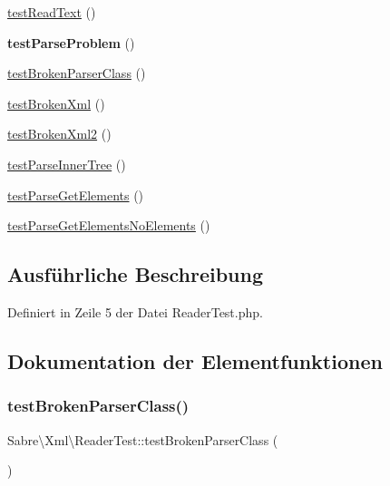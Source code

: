 \begin{DoxyCompactItemize}
\mbox{\hyperlink{class_sabre_1_1_xml_1_1_reader_test_a49fab39e675f5ffcd5bb756db6bb9074}{test\+Read\+Text}} ()
\item 
\mbox{\label{class_sabre_1_1_xml_1_1_reader_test_a900225de89ad80b6bcfbd2bf260b128a}} 
{\bfseries test\+Parse\+Problem} ()
\item 
\mbox{\hyperlink{class_sabre_1_1_xml_1_1_reader_test_a42d1e73130e127780a817258ff058d4d}{test\+Broken\+Parser\+Class}} ()
\item 
\mbox{\hyperlink{class_sabre_1_1_xml_1_1_reader_test_ac704c1ae913be4b2f010d256ba4254ee}{test\+Broken\+Xml}} ()
\item 
\mbox{\hyperlink{class_sabre_1_1_xml_1_1_reader_test_aad791c01311925e1e29c21f61676683a}{test\+Broken\+Xml2}} ()
\item 
\mbox{\hyperlink{class_sabre_1_1_xml_1_1_reader_test_a3f11340e9748ca6ea2b6c9e468c2a53a}{test\+Parse\+Inner\+Tree}} ()
\item 
\mbox{\hyperlink{class_sabre_1_1_xml_1_1_reader_test_a1450b6510bf234acca3a757caa403f71}{test\+Parse\+Get\+Elements}} ()
\item 
\mbox{\hyperlink{class_sabre_1_1_xml_1_1_reader_test_a1d666585d1cabc38795e6d4c6817183a}{test\+Parse\+Get\+Elements\+No\+Elements}} ()
\end{DoxyCompactItemize}


\subsection{Ausführliche Beschreibung}


Definiert in Zeile 5 der Datei Reader\+Test.\+php.



\subsection{Dokumentation der Elementfunktionen}
\mbox{\label{class_sabre_1_1_xml_1_1_reader_test_a42d1e73130e127780a817258ff058d4d}} 
\subsubsection{\texorpdfstring{test\+Broken\+Parser\+Class()}{testBrokenParserClass()}}
{\footnotesize\ttfamily Sabre\textbackslash{}\+Xml\textbackslash{}\+Reader\+Test\+::test\+Broken\+Parser\+Class (\begin{DoxyParamCaption}{ }\end{DoxyParamCaption})}



